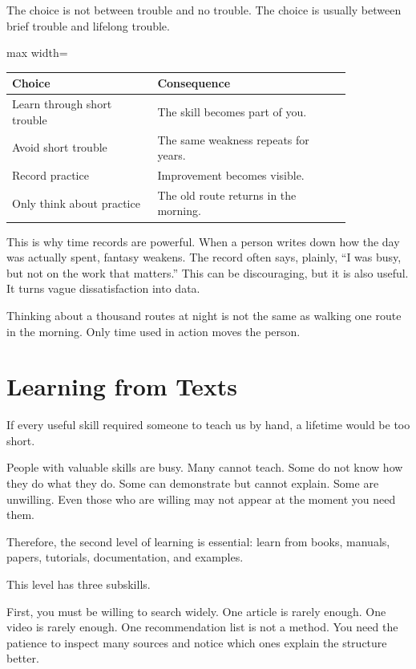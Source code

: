 The choice is not between trouble and no trouble. The choice is usually between brief trouble and lifelong trouble.

\begin{center}
\begin{adjustbox}{max width=\linewidth}
\begin{tabular}{p{0.36\linewidth}p{0.48\linewidth}}
\hline
Choice & Consequence \\
\hline
Learn through short trouble & The skill becomes part of you. \\
Avoid short trouble & The same weakness repeats for years. \\
Record practice & Improvement becomes visible. \\
Only think about practice & The old route returns in the morning. \\
\hline
\end{tabular}
\end{adjustbox}
\end{center}

This is why time records are powerful. When a person writes down how the day was actually spent, fantasy weakens. The record often says, plainly, ``I was busy, but not on the work that matters.'' This can be discouraging, but it is also useful. It turns vague dissatisfaction into data.

Thinking about a thousand routes at night is not the same as walking one route in the morning. Only time used in action moves the person.

\section*{Learning from Texts}

If every useful skill required someone to teach us by hand, a lifetime would be too short.

People with valuable skills are busy. Many cannot teach. Some do not know how they do what they do. Some can demonstrate but cannot explain. Some are unwilling. Even those who are willing may not appear at the moment you need them.

Therefore, the second level of learning is essential: learn from books, manuals, papers, tutorials, documentation, and examples.

This level has three subskills.

First, you must be willing to search widely. One article is rarely enough. One video is rarely enough. One recommendation list is not a method. You need the patience to inspect many sources and notice which ones explain the structure better.

